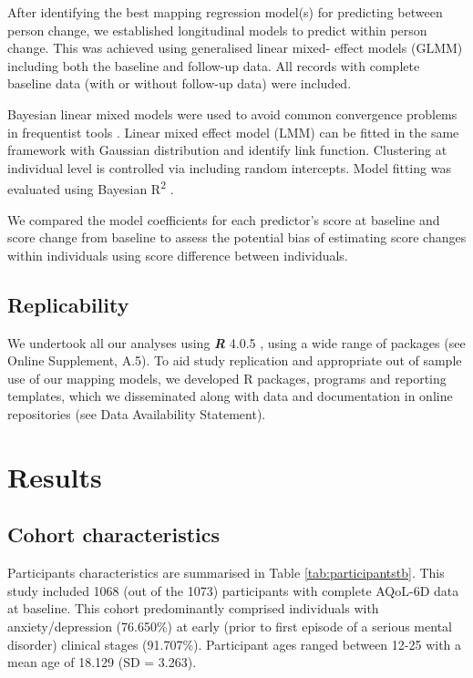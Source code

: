 \documentclass[
  journal=largetwo,
  manuscript=original-article,
  year=2023-Submission,
]{cup-journal}
\begin{document}
After identifying the best mapping regression model(s) for predicting between person change, we established longitudinal models to predict within person change. This was achieved using generalised linear mixed- effect models (GLMM) including both the baseline and follow-up data. All records with complete baseline data (with or without follow-up data) were included.

Bayesian linear mixed models were used to avoid common convergence problems in frequentist tools \autocite{bolker2009generalized}. Linear mixed effect model (LMM) can be fitted in the same framework with Gaussian distribution and identify link function. Clustering at individual level is controlled via including random intercepts. Model fitting was evaluated using Bayesian R\textsuperscript{2} \autocite{RN21}.

We compared the model coefficients for each predictor's score at baseline and score change from baseline to assess the potential bias of estimating score changes within individuals using score difference between individuals.

\subsection{Replicability}

We undertook all our analyses using \textbf{\emph{R}} 4.0.5 \autocite{RCitation}, using a wide range of packages (see Online Supplement, A.5). To aid study replication and appropriate out of sample use of our mapping models, we developed R packages, programs and reporting templates, which we disseminated along with data and documentation in online repositories (see Data Availability Statement).

\section{Results}

\subsection{Cohort characteristics}

Participants characteristics are summarised in Table \ref{tab:participantstb}. This study included 1068 (out of the 1073) participants with complete AQoL-6D data at baseline. This cohort predominantly comprised individuals with anxiety/depression (76.650\%) at early (prior to first episode of a serious mental disorder) clinical stages (91.707\%). Participant ages ranged between 12-25 with a mean age of 18.129 (SD = 3.263).
\end{document}
